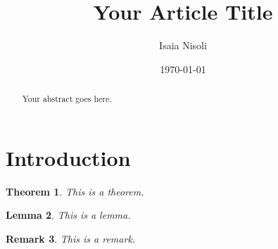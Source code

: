 \documentclass{article}
\title{Your Article Title}
\author{Isaia Nisoli}
\date{\today}
\newtheorem{theorem}{Theorem}[section] %
\newtheorem{lemma}[theorem]{Lemma}      %
\newtheorem{remark}[theorem]{Remark}    %
\begin{document}
\maketitle

\begin{abstract}
    Your abstract goes here.
\end{abstract}

\section{Introduction}

\begin{theorem}
    This is a theorem.
\end{theorem}

\begin{lemma}
    This is a lemma.
\end{lemma}

\begin{remark}
    This is a remark.
\end{remark}



\end{document}
